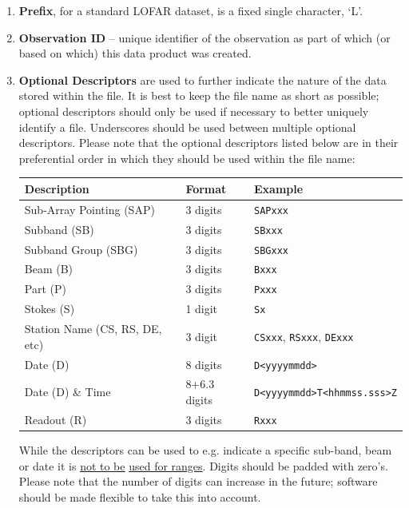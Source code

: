 \documentclass[a4paper,10pt,bibtotoc]{scrartcl}
\begin{document}
\begin{enumerate}
\item \textbf{Prefix}, for a standard LOFAR dataset, is a fixed single
  character, `L'.
\item \textbf{Observation ID} -- unique identifier of the observation
  as part of which (or based on which) this data product was created.
\item \textbf{Optional Descriptors} are used to further indicate the
  nature of the data stored within the file.  It is best to keep the
  file name as short as possible;  optional descriptors should only be
  used if necessary to better uniquely identify a file.  Underscores 
  should be used between multiple optional descriptors.  Please note 
  that the optional descriptors listed below are in their preferential 
  order in which they should be used within the file name:
  \\
  \begin{center}
    \begin{tabular}{|lll|}
      \hline
      \textbf{Description} & \textbf{Format} & \textbf{Example} \\
      \hline \hline
      Sub-Array Pointing (SAP)   & 3 digits   & \verb|SAPxxx|   \\
      Subband (SB)      & 3 digits   & \verb|SBxxx| \\
      Subband Group (SBG)      & 3 digits   & \verb|SBGxxx| \\
      Beam (B)          & 3 digits   & \verb|Bxxx| \\
      Part (P)          & 3 digits   & \verb|Pxxx| \\
      Stokes (S)        & 1 digit    & \verb|Sx| \\
      Station Name (CS, RS, DE, etc)  & 3 digit  & \verb|CSxxx|, \verb|RSxxx|, \verb|DExxx| \\
      Date (D)          & 8 digits   & \verb|D<yyyymmdd>| \\
      Date (D) \& Time  & 8+6.3 digits & \verb|D<yyyymmdd>T<hhmmss.sss>Z| \\
      Readout (R)       & 3 digits   & \verb|Rxxx| \\
      \hline
    \end{tabular}
  \end{center}
  While the descriptors can be used to e.g. indicate a specific sub-band, beam
  or date it is \underline{not to be} \underline{used for ranges}.
  Digits should be padded with zero's.  Please note that the number of
  digits can increase in the future;  software should be made flexible
  to take this into account.
  

\end{enumerate}
\end{document}
